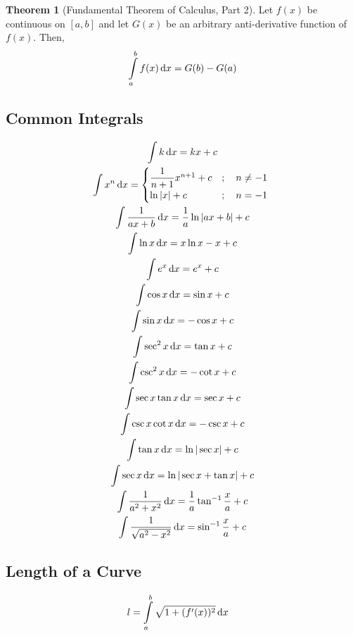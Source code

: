 \documentclass[fleqn, a4paper, 10pt]{article}
\theoremstyle{definition}
\theoremstyle{theorem}
\newtheorem{theorem}{Theorem}
\theoremstyle{remark}
\begin{document}
\begin{multicols}{2}
\begin{theorem}[Fundamental Theorem of Calculus, Part 2]
	Let $f(x)$ be continuous on $[a, b]$ and let $G(x)$ be an arbitrary anti-derivative function of $f(x)$. Then,
	\begin{equation*}
	\int\limits_{a}^{b} f(x) \dif x = G(b) - G(a)
	\end{equation*}
\end{theorem}

\subsection{Common Integrals}

\begin{gather*}
	\int k \dif x = kx + c\\
	\int x^n \dif x = 
		\begin{cases}
			\dfrac{1}{n + 1} x^{n + 1} + c &; \quad n \neq -1\\
			\ln |x| + c &;\quad n = -1\
		\end{cases}\\
	\int \dfrac{1}{a x + b} \dif x = \dfrac{1}{a} \ln |a x + b| + c\\
	\int \ln x \dif x = x \ln x - x + c\\
	\int e^x \dif x = e^x + c\\
	\int \cos x \dif x = \sin x + c\\
	\int \sin x \dif x = - \cos x + c\\
	\int \sec^2 x \dif x = \tan x + c\\
	\int \csc^2 x \dif x = -\cot x + c\\
	\int \sec x \tan x \dif x = \sec x + c\\
	\int \csc x \cot x \dif x = -\csc x + c\\
	\int \tan x \dif x = \ln |\sec x| + c\\
	\int \sec x \dif x = \ln |\sec x + \tan x| + c\\
	\int \dfrac{1}{a^2 + x^2} \dif x = \dfrac{1}{a} \tan^{-1} \dfrac{x}{a} + c\\
	\int \dfrac{1}{\sqrt{a^2 - x^2}} \dif x = \sin^{-1} \dfrac{x}{a} + c
\end{gather*}

\subsection{Length of a Curve}

\begin{align*}
	l &= \int\limits_{a}^{b} \sqrt{1 + (f'(x))^2} \dif x
\end{align*}


\end{multicols}
\end{document}
